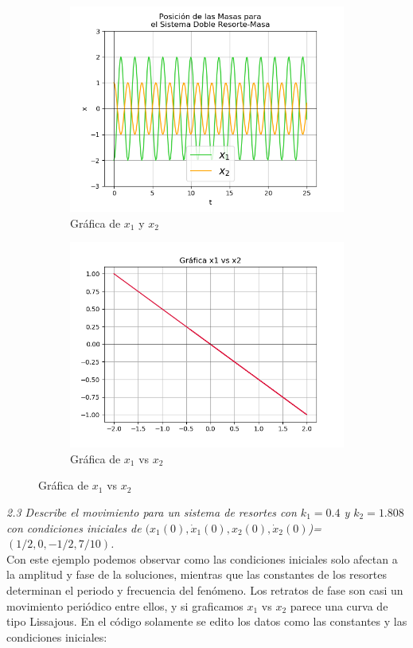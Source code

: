 \documentclass[12pt]{article}
\begin{document}
\begin{figure}[h!]
\begin{subfigure}{.6\textwidth}
  \centering
  \includegraphics[width=.8\linewidth]{Ej2_21.png}
  \caption{Gráfica de $x_1$ y $x_2$}
  \label{fig:sfig2}
\end{subfigure}
\begin{subfigure}{.6\textwidth}
  \centering
  \includegraphics[width=.8\linewidth]{Ej2_22.png}
  \caption{Gráfica de $x_1$ vs $x_2$}
  \label{fig:sfig2}
\end{subfigure}
\end{figure}

\noindent \textit{2.3 Describe el movimiento para un sistema de resortes con $k_1=0.4$ y $k_2=1.808$ con condiciones iniciales de $(x_1(0), \dot x_1(0), x_2(0), \dot x_2(0)$)=$(1/2,0,-1/2,7/10)$.}\\

Con este ejemplo podemos observar como las condiciones iniciales solo afectan a la amplitud y fase de la soluciones, mientras que las constantes de los resortes determinan el periodo y frecuencia del fenómeno. Los retratos de fase son casi un movimiento periódico entre ellos, y si graficamos $x_1$ vs $x_2$ parece una curva de tipo Lissajous. En el código solamente se edito los datos como las constantes y las condiciones iniciales:
\end{document}
